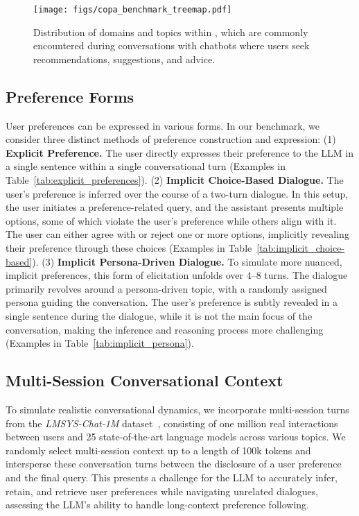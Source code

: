 \begin{figure}[t]
    \centering
  
          \texttt{[image: figs/copa\_benchmark\_treemap.pdf]}
\caption{Distribution of domains and topics within \ours{}, which are commonly encountered during conversations with chatbots where users seek recommendations, suggestions, and advice.}
\label{fig:topic}
\end{figure}

\subsection{Preference Forms} 
\label{sec:preference_Forms}

User preferences can be expressed in various forms. In our benchmark, we consider three distinct methods of preference construction and expression: (1) \textbf{Explicit Preference.} The user directly expresses their preference to the LLM in a single sentence within a single conversational turn (Examples in Table~\ref{tab:explicit_preferences}). (2) \textbf{Implicit Choice-Based Dialogue.} The user’s preference is inferred over the course of a two-turn dialogue. In this setup, the user initiates a preference-related query, and the assistant presents multiple options, some of which violate the user’s preference while others align with it. The user can either agree with or reject one or more options, implicitly revealing their preference through these choices (Examples in Table~\ref{tab:implicit_choice-based}). (3) \textbf{Implicit Persona-Driven Dialogue.} To simulate more nuanced, implicit preferences, this form of elicitation unfolds over 4–8 turns. The dialogue primarily revolves around a persona-driven topic, with a randomly assigned persona guiding the conversation. The user's preference is subtly revealed in a single sentence during the dialogue, while it is not the main focus of the conversation, making the inference and reasoning process more challenging (Examples in Table~\ref{tab:implicit_persona}).

\vspace{-2mm}

\subsection{Multi-Session Conversational Context}
\label{sec:lmsys}
To simulate realistic conversational dynamics, we incorporate multi-session turns from the \textit{LMSYS-Chat-1M} dataset~\citep{zheng2023lmsyschat1m}, consisting of one million real interactions between users and 25 state-of-the-art language models across various topics. We randomly select multi-session context up to a length of 100k tokens and intersperse these conversation turns between the disclosure of a user preference and the final query. This presents a challenge for the LLM to accurately infer, retain, and retrieve user preferences while navigating unrelated dialogues, assessing the LLM's ability to handle long-context preference following.

